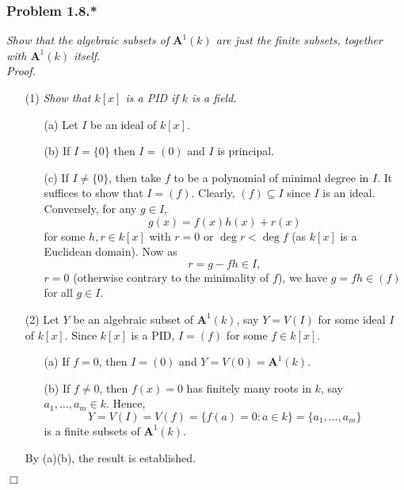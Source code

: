 \documentclass{article}
\begin{document}
\subsubsection*{Problem 1.8.*}
\emph{Show that the algebraic subsets of $\mathbf{A}^1(k)$ are just the finite subsets, together
with $\mathbf{A}^1(k)$ itself.} \\

\emph{Proof.}
\begin{enumerate}
\item[(1)]
  \emph{Show that $k[x]$ is a PID if $k$ is a field.}
  \begin{enumerate}
  \item[(a)]
    Let $I$ be an ideal of $k[x]$.

  \item[(b)]
    If $I = \{0\}$ then $I = (0)$ and $I$ is principal.

  \item[(c)]
    If $I \neq \{0\}$, then take $f$ to be a polynomial of minimal degree in $I$.
    It suffices to show that $I = (f)$.
    Clearly, $(f) \subseteq I$ since $I$ is an ideal.
    Conversely, for any $g \in I$,
    \[
      g(x) = f(x)h(x) + r(x)
    \]
    for some $h, r \in k[x]$ with $r = 0$ or $\deg r < \deg f$ (as $k[x]$ is a Euclidean domain).
    Now as
    \[
      r = g - fh \in I,
    \]
    $r = 0$ (otherwise contrary to the minimality of $f$),
    we have $g = fh \in (f)$ for all $g \in I$.
  \end{enumerate}

\item[(2)]
  Let $Y$ be an algebraic subset of $\mathbf{A}^1(k)$,
  say $Y = V(I)$ for some ideal $I$ of $k[x]$.
  Since $k[x]$ is a PID, $I = (f)$ for some $f \in k[x]$.
  \begin{enumerate}
  \item[(a)]
    If $f = 0$, then $I = (0)$ and $Y = V(0) = \mathbf{A}^1(k)$.

  \item[(b)]
    If $f \neq 0$, then $f(x) = 0$ has finitely many roots in $k$,
    say $a_1, \ldots, a_m \in k$.
    Hence,
    \[
      Y = V(I) = V(f) = \{ f(a) = 0 : a \in k \}
      = \{ a_1, \ldots, a_m \}
    \]
    is a finite subsets of $\mathbf{A}^1(k)$.
  \end{enumerate}
  By (a)(b), the result is established.
\end{enumerate}
$\Box$ \\
\end{document}
